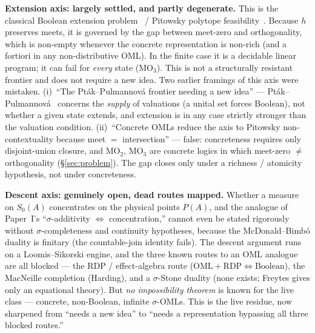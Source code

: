 \documentclass[11pt]{article}
\theoremstyle{definition}
\begin{document}
\medskip\noindent
\textbf{Extension axis: largely settled, and partly degenerate.}
This is the classical Boolean extension
problem~\cite{HornTarski1948} / Pitowsky polytope
feasibility~\cite{Pitowsky1989}.  Because $h$ preserves meets, it
is governed by the gap between meet-zero and orthogonality, which
is non-empty whenever the concrete representation is non-rich (and a
fortiori in any non-distributive OML).  In the finite case it is a
decidable linear program; it can fail for \emph{every} state
($\mathrm{MO}_3$).  This is not a structurally resistant frontier
and does not require a new idea.  Two earlier framings of this axis
were mistaken.  (i)~``The Pt\'{a}k--Pulmannov\'{a} frontier needing a
new idea'' --- Pt\'{a}k--Pulmannov\'{a}~\cite{PtakPulmannova1994}
concerns the \emph{supply} of valuations (a unital set forces
Boolean), not whether a given state extends, and extension is in
any case strictly stronger than the valuation condition.
(ii)~``Concrete OMLs reduce the axis to Pitowsky non-contextuality
because meet $=$ intersection'' --- false: concreteness requires only
disjoint-union closure, and $\mathrm{MO}_2$, $\mathrm{MO}_3$ are
concrete logics in which meet-zero $\neq$ orthogonality
(\S\ref{sec:problem}).  The gap closes only under a richness /
atomicity hypothesis, not under concreteness.

\medskip\noindent
\textbf{Descent axis: genuinely open, dead routes mapped.}  Whether a
measure on $S_0(A)$ concentrates on the physical points $P(A)$, and
the analogue of Paper~I's ``$\sigma$-additivity $\Leftrightarrow$
concentration,'' cannot even be stated rigorously without
$\sigma$-completeness and continuity hypotheses, because the
McDonald--Bimb\'{o} duality is finitary (the countable-join identity
fails).  The descent argument runs on a Loomis--Sikorski engine, and
the three known routes to an OML analogue are all blocked --- the
RDP / effect-algebra route ($\text{OML} + \text{RDP} \Leftrightarrow
\text{Boolean}$), the MacNeille completion (Harding), and a
$\sigma$-Stone duality (none exists; Freytes gives only an equational
theory).  But \emph{no impossibility theorem} is known for the live
class --- concrete, non-Boolean, infinite $\sigma$-OMLs.  This is the
live residue, now sharpened from ``needs a new idea'' to ``needs a
representation bypassing all three blocked routes.''
\end{document}
